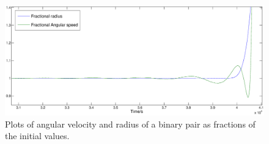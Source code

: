 \documentclass[letterpaper, preprint, paper,11pt]{AAS}	%
\begin{document}
\begin{center}
\begin{figure}[H]
\centering
\centerline{\includegraphics[width=1.2\textwidth]{omega.eps}} 
\caption{Plots of angular velocity and radius of a binary pair as fractions of the initial values.} 
\label{fig:omega}
\end{figure}
\end{center}
\end{document}
